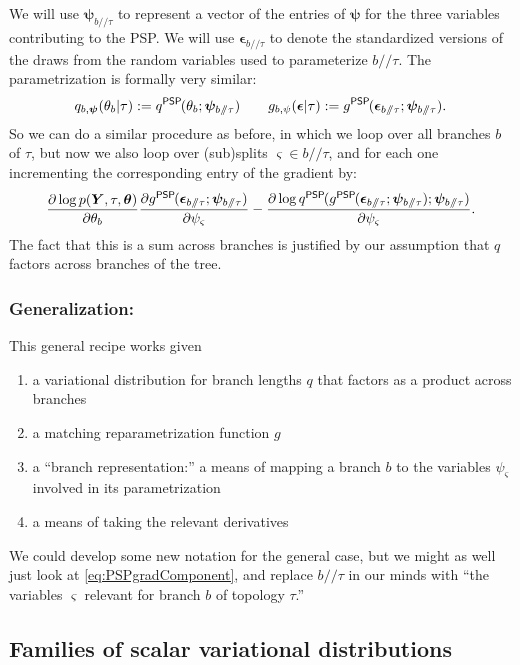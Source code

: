\documentclass{article}
\newcommand{\psp}{\slash\!\!\slash}
\newcommand{\qPSP}{q^\textsf{PSP}\hspace{-1pt}}
\newcommand{\gPSP}{g^\textsf{PSP}\hspace{-1pt}}
\begin{document}
We will use $\bm\psi_{b \psp \tau}$ to represent a vector of the entries of $\bm\psi$ for the three variables contributing to the PSP.
We will use $\bm\epsilon_{b \psp \tau}$ to denote the standardized versions of the draws from the random variables used to parameterize $b \psp \tau$.
The parametrization is formally very similar:
\[
q_{b, \bm{\psi}}(\theta_b | \tau) := \qPSP(\theta_b; \bm\psi_{b \psp \tau})
\qquad
g_{b,\psi}(\bm\epsilon | \tau) := \gPSP(\bm\epsilon_{b \psp \tau}; \bm\psi_{b \psp \tau}).
\]
So we can do a similar procedure as before, in which we loop over all branches $b$ of $\tau$, but now we also loop over (sub)splits $\varsigma \in b \psp \tau$, and for each one incrementing the corresponding entry of the gradient by:
\begin{equation}
    \frac{\partial \log p(\bm{Y}, \tau, \bm\theta)}{\partial \theta_b}
    \frac{\partial \gPSP(\bm\epsilon_{b \psp \tau}; \bm\psi_{b \psp \tau})}{\partial \psi_{\varsigma}}
    - \frac{\partial \log \qPSP(\gPSP(\bm\epsilon_{b \psp \tau}; \bm\psi_{b \psp \tau}); \bm\psi_{b \psp \tau})}{\partial \psi_{\varsigma}}.
    \label{eq:PSPgradComponent}
\end{equation}
The fact that this is a sum across branches is justified by our assumption that $q$ factors across branches of the tree.

\subsubsection*{Generalization:}
This general recipe works given
\begin{enumerate}
    \item a variational distribution for branch lengths $q$ that factors as a product across branches
    \item a matching reparametrization function $g$
    \item a ``branch representation:'' a means of mapping a branch $b$ to the variables $\psi_\varsigma$ involved in its parametrization
    \item a means of taking the relevant derivatives
\end{enumerate}

We could develop some new notation for the general case, but we might as well just look at \eqref{eq:PSPgradComponent}, and replace $b \psp \tau$ in our minds with ``the variables $\varsigma$ relevant for branch $b$ of topology $\tau$.''


\subsection*{Families of scalar variational distributions}
\end{document}
